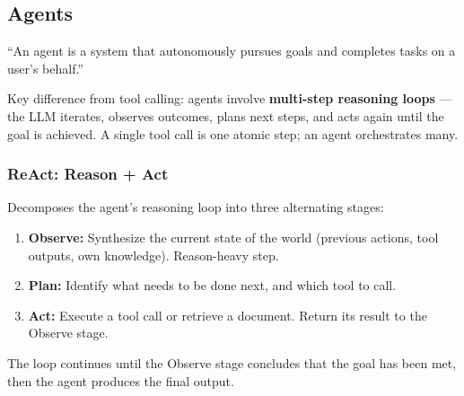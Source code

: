 \documentclass[11pt, a4paper]{article}
\begin{document}
\subsection{Agents}

\begin{defbox}
``An agent is a system that autonomously pursues goals and completes tasks on a user's behalf.''

Key difference from tool calling: agents involve \textbf{multi-step reasoning loops} --- the LLM iterates, observes outcomes, plans next steps, and acts again until the goal is achieved. A single tool call is one atomic step; an agent orchestrates many.
\end{defbox}

\subsubsection{ReAct: Reason + Act}

\begin{defbox}
Decomposes the agent's reasoning loop into three alternating stages:

\begin{enumerate}[leftmargin=1.5em]
  \item \textbf{Observe:} Synthesize the current state of the world (previous actions, tool outputs, own knowledge). Reason-heavy step.
  \item \textbf{Plan:} Identify what needs to be done next, and which tool to call.
  \item \textbf{Act:} Execute a tool call or retrieve a document. Return its result to the Observe stage.
\end{enumerate}

The loop continues until the Observe stage concludes that the goal has been met, then the agent produces the final output.
\end{defbox}
\end{document}
